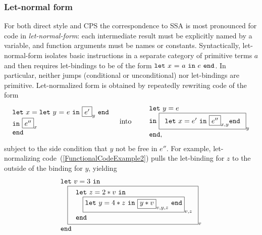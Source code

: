 
\subsubsection{Let-normal form}
For both direct style and CPS the correspondence to SSA is most
pronounced for code in \emph{let-normal-form}: each intermediate
result must be explicitly named by a variable, and function arguments
must be names or constants. Syntactically, let-normal-form isolates
basic instructions in a separate category of primitive terms $a$ and
then requires let-bindings to be of the form $\mathtt{let}\ {x}\ \mathtt{=}\ {a}\ \mathtt{in}\ {e}\ \mathtt{end}$.  In
particular, neither jumps (conditional or unconditional) nor
let-bindings are primitive. Let-normalized form is obtained by
repeatedly rewriting code of the form
\begin{eqnarray*}
 \begin{array}{l}
   \mathtt{let}\ x = \letin y {e} {\fbox{$e'$}_y}\\
   \mathtt{in}\ {\fbox{$e''$}_{x}}\\ 
   \mathtt{end}
  \end{array}
& \quad \textrm{into} \quad &
  \begin{array}{l}
    \mathtt{let}\ y = e\\
    \mathtt{in}\ \fbox{$\begin{array}{l}
                            \mathtt{let}\ x = {e'}\ 
                            \mathtt{in}\ {\fbox{$e''$}_{x,y}}
                            \mathtt{end}
                        \end{array}$}_y\\
    \mathtt{end,}
  \end{array}
\end{eqnarray*}
subject to the side condition that $y$ not be free in $e''$.
For example, let-normalizing code~(\ref{FunctionalCodeExample2}) pulls the
let-binding for $z$ to the outside of the binding for $y$, yielding
\begin{equation}
\label{FunctionalCodeExample4}
\begin{array}{l}
\mathtt{let}\ v = 3\ \mathtt{in}\\
\quad 
  {\fbox{
   $\begin{array}[t]{l} 
     \mathtt{let}\ z=2*v \ \mathtt{in}\\
     \quad {\fbox{$\mathtt{let}\ y = 4*z\ \mathtt{in}\ 
                 \fbox{$y*v$}_{v,y,z}\ \mathtt{end}$}_{v,z}}\\
     \mathtt{end}
   \end{array}$}_{v}}\\
\mathtt{end}
\end{array}
\end{equation}

